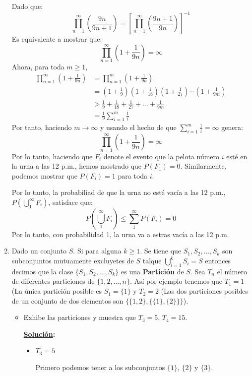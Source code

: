 \documentclass[11pt,letterpaper]{report}
\newcommand{\sol}{\textbf{\underline{Solución}: }} %
\begin{document}
\begin{enumerate}
Dado que:
\[
    \prod_{n=1}^{\infty} (\frac{9n}{9n+1}) = [\prod_{n=1}^{\infty} (\frac{9n+1}{9n})]^{-1}
\]
Es equivalente a mostrar que:
\[
    \prod_{n=1}^{\infty} (1 + \frac{1}{9n}) = \infty
\]
Ahora, para toda $m \geq 1$,
\begin{align*}
    \prod_{n=1}^{\infty} (1 + \frac{1}{9n})
        &= \prod_{n=1}^{m} (1 + \frac{1}{9n})\\
        &= (1 + \frac{1}{9}) (1 + \frac{1}{18}) (1 + \frac{1}{27}) \cdots (1 + \frac{1}{9m})\\
        &> \frac{1}{9} + \frac{1}{18} + \frac{1}{27} + \ldots + \frac{1}{9m}\\
        &= \frac{1}{9} \sum_{i=1}^{m} \frac{1}{i}
\end{align*}
Por tanto, haciendo $m \to \infty$ y usando el hecho de que $\sum_{i=1}^{m} \frac{1}{i} = \infty$
genera:
$$\prod_{n=1}^{\infty} (1 + \frac{1}{9n}) = \infty$$
Por lo tanto, haciendo que $F_i$ denote el evento que la pelota número $i$ esté en la urna a las
12 p.m., hemos mostrado que $P(F_1)= 0$. Similarmente, podemos mostrar que $P(F_i)=1$ para
toda $i$.

Por lo tanto, la probabiliad de que la urna no esté vacía a las 12 p.m.,
$P(\bigcup_{1}^{\infty} F_i)$, satisface que:
\[
    P(\bigcup_{1}^{\infty} F_i) \leq \sum_{1}^{\infty} P(F_i) = 0
\]
Por lo tanto, con probabilidad 1, la urna va a estras vacía a las 12 p.m.


\item Dado un conjunto $S$. Si para alguna $k \geq 1$. Se tiene que $S_1, S_2, \ldots, S_k$ son
subconjuntos mutuamente excluyetes de $S$ talque $\bigcup_{i=1}^{k} S_i = S$ entonces decimos
que la clase $\{ S_1, S_2, \ldots, S_k \}$ es una \textbf{Partición} de $S$. Sea $T_n$ el número
de diferentes particiones de $\{ 1, 2, \ldots , n \}$. Así por ejemplo tenemos que
$T_1 = 1$ (La única partición posible es $S_1 = \{ 1 \}$ y $T_2 = 2$ (Las dos particiones
posibles de un conjunto de dos elementos son $\{ \{ 1, 2 \}, \{ \{ 1 \}, \{ 2 \} \} \}$).

\begin{itemize}
    \item Exhibe las particiones y muestra que $T_3 = 5$, $T_4 = 15$.
    
    \sol
    \begin{itemize}
        \item $T_3 = 5$
        
        Primero podemos tener a los subconjuntos $\{1\}$, $\{2\}$ y $\{3\}$.
        

\end{itemize}
\end{itemize}
\end{enumerate}
\end{document}
